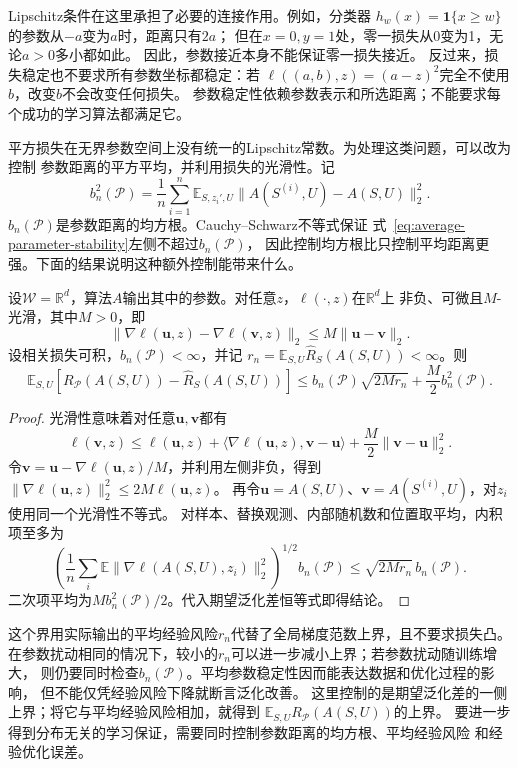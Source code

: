 Lipschitz条件在这里承担了必要的连接作用。例如，分类器
$h_w(x)=\mathbf1\{x\geq w\}$的参数从$-a$变为$a$时，距离只有$2a$；
但在$x=0,y=1$处，零一损失从0变为1，无论$a>0$多小都如此。
因此，参数接近本身不能保证零一损失接近。
反过来，损失稳定也不要求所有参数坐标都稳定：若
$\ell((a,b),z)=(a-z)^2$完全不使用$b$，改变$b$不会改变任何损失。
参数稳定性依赖参数表示和所选距离；不能要求每个成功的学习算法都满足它。

平方损失在无界参数空间上没有统一的Lipschitz常数。为处理这类问题，可以改为控制
参数距离的平方平均，并利用损失的光滑性。记
\[
 b_n^2(\mathcal P)
 =\frac1n\sum_{i=1}^n\mathbb E_{S,z_i',U}
       \|A(S^{(i)},U)-A(S,U)\|_2^2.
\]
$b_n(\mathcal P)$是参数距离的均方根。Cauchy--Schwarz不等式保证
式~\eqref{eq:average-parameter-stability}左侧不超过$b_n(\mathcal P)$，
因此控制均方根比只控制平均距离更强。下面的结果说明这种额外控制能带来什么。

\begin{theorem}[光滑损失下参数稳定性与期望泛化差]
\label{thm:smooth-parameter-generalization}
设$\mathcal W=\mathbb R^d$，算法$A$输出其中的参数。对任意$z$，$\ell(\cdot,z)$在$\mathbb R^d$上
非负、可微且$M$-光滑，其中$M>0$，即
\[
 \|\nabla\ell(\bm u,z)-\nabla\ell(\bm v,z)\|_2
 \leq M\|\bm u-\bm v\|_2.
\]
设相关损失可积，$b_n(\mathcal P)<\infty$，并记
$r_n=\mathbb E_{S,U}\hat R_S(A(S,U))<\infty$。则
\begin{equation}
 \mathbb E_{S,U}[R_{\mathcal P}(A(S,U))-\hat R_S(A(S,U))]
 \leq b_n(\mathcal P)\sqrt{2Mr_n}+\frac M2 b_n^2(\mathcal P).
 \label{eq:smooth-parameter-generalization}
\end{equation}
\end{theorem}
\begin{proof}
光滑性意味着对任意$\bm u,\bm v$都有
\[
 \ell(\bm v,z)\leq\ell(\bm u,z)
 +\langle\nabla\ell(\bm u,z),\bm v-\bm u\rangle
 +\frac M2\|\bm v-\bm u\|_2^2.
\]
令$\bm v=\bm u-\nabla\ell(\bm u,z)/M$，并利用左侧非负，得到
$\|\nabla\ell(\bm u,z)\|_2^2\leq2M\ell(\bm u,z)$。
再令$\bm u=A(S,U)$、$\bm v=A(S^{(i)},U)$，对$z_i$使用同一个光滑性不等式。
对样本、替换观测、内部随机数和位置取平均，内积项至多为
\[
 \left(\frac1n\sum_i\mathbb E\|\nabla\ell(A(S,U),z_i)\|_2^2\right)^{1/2}
 b_n(\mathcal P)
 \leq\sqrt{2Mr_n}\,b_n(\mathcal P).
\]
二次项平均为$Mb_n^2(\mathcal P)/2$。代入期望泛化差恒等式即得结论。
\end{proof}

这个界用实际输出的平均经验风险$r_n$代替了全局梯度范数上界，且不要求损失凸。
在参数扰动相同的情况下，较小的$r_n$可以进一步减小上界；若参数扰动随训练增大，
则仍要同时检查$b_n(\mathcal P)$。平均参数稳定性因而能表达数据和优化过程的影响，
但不能仅凭经验风险下降就断言泛化改善。
这里控制的是期望泛化差的一侧上界；将它与平均经验风险相加，就得到
$\mathbb E_{S,U}R_{\mathcal P}(A(S,U))$的上界。
要进一步得到分布无关的学习保证，需要同时控制参数距离的均方根、平均经验风险
和经验优化误差。

